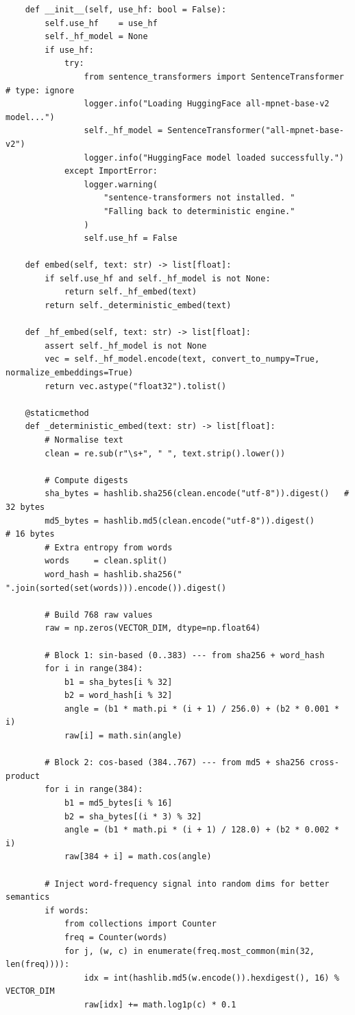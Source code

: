 \documentclass[12pt,a4paper]{report}
\begin{document}
\begin{lstlisting}
    def __init__(self, use_hf: bool = False):
        self.use_hf    = use_hf
        self._hf_model = None
        if use_hf:
            try:
                from sentence_transformers import SentenceTransformer  # type: ignore
                logger.info("Loading HuggingFace all-mpnet-base-v2 model...")
                self._hf_model = SentenceTransformer("all-mpnet-base-v2")
                logger.info("HuggingFace model loaded successfully.")
            except ImportError:
                logger.warning(
                    "sentence-transformers not installed. "
                    "Falling back to deterministic engine."
                )
                self.use_hf = False

    def embed(self, text: str) -> list[float]:
        if self.use_hf and self._hf_model is not None:
            return self._hf_embed(text)
        return self._deterministic_embed(text)

    def _hf_embed(self, text: str) -> list[float]:
        assert self._hf_model is not None
        vec = self._hf_model.encode(text, convert_to_numpy=True, normalize_embeddings=True)
        return vec.astype("float32").tolist()

    @staticmethod
    def _deterministic_embed(text: str) -> list[float]:
        # Normalise text
        clean = re.sub(r"\s+", " ", text.strip().lower())

        # Compute digests
        sha_bytes = hashlib.sha256(clean.encode("utf-8")).digest()   # 32 bytes
        md5_bytes = hashlib.md5(clean.encode("utf-8")).digest()       # 16 bytes
        # Extra entropy from words
        words     = clean.split()
        word_hash = hashlib.sha256(" ".join(sorted(set(words))).encode()).digest()

        # Build 768 raw values
        raw = np.zeros(VECTOR_DIM, dtype=np.float64)

        # Block 1: sin-based (0..383) --- from sha256 + word_hash
        for i in range(384):
            b1 = sha_bytes[i % 32]
            b2 = word_hash[i % 32]
            angle = (b1 * math.pi * (i + 1) / 256.0) + (b2 * 0.001 * i)
            raw[i] = math.sin(angle)

        # Block 2: cos-based (384..767) --- from md5 + sha256 cross-product
        for i in range(384):
            b1 = md5_bytes[i % 16]
            b2 = sha_bytes[(i * 3) % 32]
            angle = (b1 * math.pi * (i + 1) / 128.0) + (b2 * 0.002 * i)
            raw[384 + i] = math.cos(angle)

        # Inject word-frequency signal into random dims for better semantics
        if words:
            from collections import Counter
            freq = Counter(words)
            for j, (w, c) in enumerate(freq.most_common(min(32, len(freq)))):
                idx = int(hashlib.md5(w.encode()).hexdigest(), 16) % VECTOR_DIM
                raw[idx] += math.log1p(c) * 0.1


\end{lstlisting}
\end{document}
